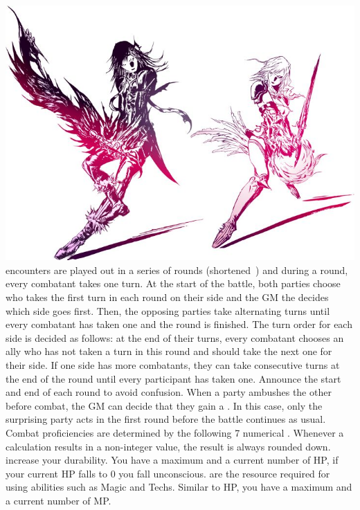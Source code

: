 %
\\
%
\includegraphics[width=\columnwidth]{./art/images/ff13-2.jpg}
%
\vfill
%
 encounters are played out in a series of rounds (shortened~) and during a round, every combatant takes one turn.
At the start of the battle, both parties choose who takes the first turn in each round on their side and the GM the decides which side goes first.
Then, the opposing parties take alternating turns until every combatant has taken one and the round is finished.
The turn order for each side is decided as follows: at the end of their turns, every combatant chooses an ally who has not taken a turn in this round and should take the next one for their side.
If one side has more combatants, they can take consecutive turns at the end of the round until every participant has taken one.
Announce the start and end of each round to avoid confusion.
When a party ambushes the other before combat, the GM can decide that they gain a .
In this case, only the surprising party acts in the first round before the battle continues as usual.
%
\vfill
%
Combat proficiencies are determined by the following 7 numerical .
Whenever a calculation results in a non-integer value, the result is always rounded down.
%
\ofgap
%
 increase your durability. You have a maximum and a current number of HP, if your current HP falls to 0 you fall unconscious. \ofrow
{} are the resource required for using abilities such as Magic and Techs. Similar to HP, you have a maximum and a current number of MP. \ofrow

